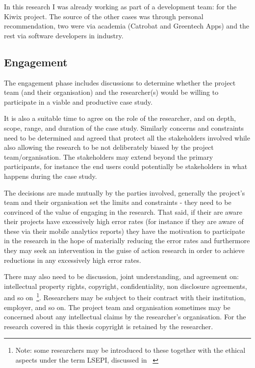 In this research I was already working as part of a development team: for the Kiwix project. The source of the other cases was through personal recommendation, two were via academia (Catrobat and Greentech Apps) and the rest via software developers in industry.

\subsection{Engagement}
The engagement phase includes discussions to determine whether the project team (and their organisation) and the researcher(s) would be willing to participate in a viable and productive case study. 

It is also a suitable time to agree on the role of the researcher, and on depth, scope, range, and duration of the case study. Similarly concerns and constraints need to be determined and agreed that protect all the stakeholders involved while also allowing the research to be not deliberately biased by the project team/organisation. The stakeholders may extend beyond the primary participants, for instance the end users could potentially be stakeholders in what happens during the case study.

The decisions are made mutually by the parties involved, generally the project's team and their organisation set the limits and constraints - they need to be convinced of the value of engaging in the research. That said, if their are aware their projects have excessively high error rates (for instance if they are aware of these via their mobile analytics reports) they have the motivation to participate in the research in the hope of materially reducing the error rates and furthermore they may seek an intervention in the guise of action research in order to achieve reductions in any excessively high error rates.

There may also need to be discussion, joint understanding, and agreement on: intellectual property rights, copyright, confidentiality, non disclosure agreements, and so on~\footnote{Note: some researchers may be introduced to these together with the ethical aspects under the term LSEPI, discussed in ~\citet{brooke2018__becoming_professional_a_university_perspective}}. Researchers may be subject to their contract with their institution, employer, and so on. The project team and organisation sometimes may be concerned about any intellectual claims by the researcher's organisation. For the research covered in this thesis copyright is retained by the researcher.

